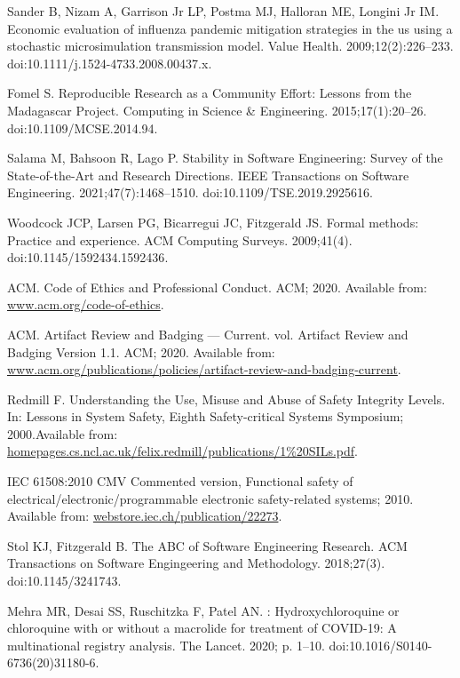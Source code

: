 \documentclass[10pt,letterpaper]{article}
\begin{document}
{\begin{thebibliography}{10}
Sander B, Nizam A, {Garrison Jr} LP, Postma MJ, Halloran ME, {Longini Jr } IM.
\newblock Economic evaluation of influenza pandemic mitigation strategies in
  the us using a stochastic microsimulation transmission model.
\newblock Value Health. 2009;12(2):226--233.
\newblock doi:{10.1111/j.1524-4733.2008.00437.x}.

Fomel S.
\newblock Reproducible Research as a Community Effort: Lessons from the
  {Madagascar Project}.
\newblock Computing in Science {\&} Engineering. 2015;17(1):20--26.
\newblock doi:{10.1109/MCSE.2014.94}.

Salama M, Bahsoon R, Lago P.
\newblock Stability in Software Engineering: Survey of the State-of-the-Art and
  Research Directions.
\newblock IEEE Transactions on Software Engineering. 2021;47(7):1468--1510.
\newblock doi:{10.1109/TSE.2019.2925616}.

Woodcock JCP, Larsen PG, Bicarregui JC, Fitzgerald JS.
\newblock Formal methods: {Practice} and experience.
\newblock ACM Computing Surveys. 2009;41(4).
\newblock doi:{10.1145/1592434.1592436}.

ACM.
\newblock Code of Ethics and Professional Conduct.
\newblock ACM; 2020.
\newblock Available from: \url{www.acm.org/code-of-ethics}.

ACM.
\newblock Artifact Review and Badging --- Current. vol. Artifact Review and
  Badging Version 1.1.
\newblock ACM; 2020.
\newblock Available from:
  \url{www.acm.org/publications/policies/artifact-review-and-badging-current}.

Redmill F.
\newblock Understanding the Use, Misuse and Abuse of Safety Integrity Levels.
\newblock In: Lessons in System Safety, Eighth Safety-critical Systems
  Symposium; 2000.Available from:
  \url{homepages.cs.ncl.ac.uk/felix.redmill/publications/1%20SILs.pdf}.

IEC 61508:2010 CMV Commented version, Functional safety of
  electrical/electronic/programmable electronic safety-related systems; 2010.
\newblock Available from: \url{webstore.iec.ch/publication/22273}.

Stol KJ, Fitzgerald B.
\newblock The ABC of Software Engineering Research.
\newblock ACM Transactions on Software Engingeering and Methodology.
  2018;27(3).
\newblock doi:{10.1145/3241743}.

Mehra MR, Desai SS, Ruschitzka F, Patel AN.
: {Hydroxychloroquine} or chloroquine with or without a
  macrolide for treatment of {COVID}-19: {A} multinational registry analysis.
\newblock The Lancet. 2020; p. 1--10.
\newblock doi:{10.1016/S0140-6736(20)31180-6}.


\end{thebibliography}}
\end{document}
